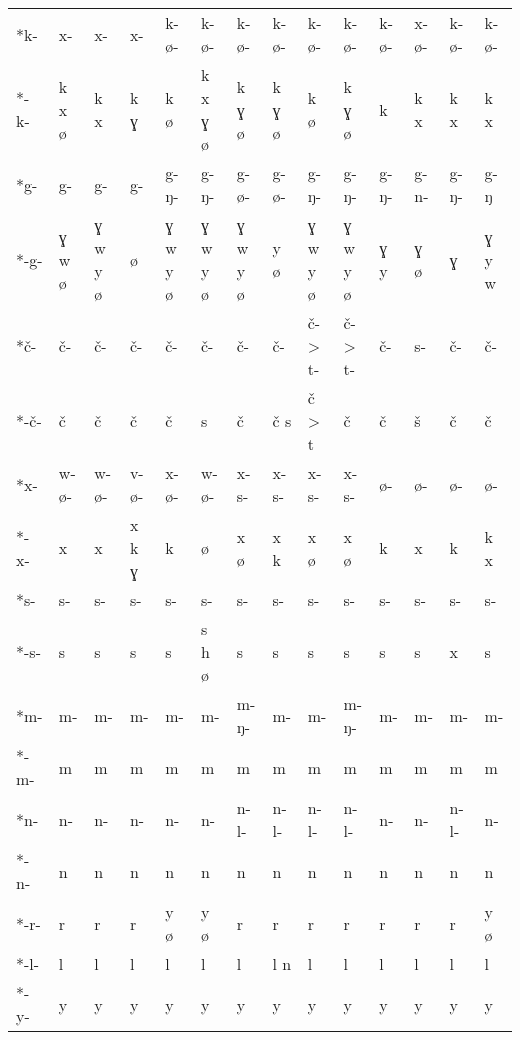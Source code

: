 \documentclass[output=paper,colorlinks,citecolor=brown]{langscibook}
\begin{document}
\begin{paperappendix}
\begin{longtable}{l  p{0.45cm}  p{0.45cm}  p{0.45cm}  p{0.45cm}  p{0.45cm}  p{0.45cm}  p{0.45cm}  p{0.45cm}  p{0.45cm}  p{0.45cm}  p{0.45cm}  p{0.45cm}  p{0.55cm}}
\tablevspace
*k-     &	x-  &	x-  &	x-  &	k- ø-   &	k- ø-   &	k- ø-   &	k- ø-   &	k- ø-   &	k- ø-   &	k- ø-   &	x- ø-   &	k- ø-   &	k- ø-\\
\tablevspace
*-k-    &	k x ø   &	k x &	k ɣ &	k ø &	k x ɣ ø &	k ɣ ø   &	k ɣ ø   &	k ø &	 k ɣ ø  &	k   &	k x &	k x &	k x\\
\tablevspace
*g-     &	g-  &	g-  &	g-  &	g- ŋ-   &	g- ŋ-   &	g- ø-   &	g- ø-   &	g- ŋ-   &	g- ŋ-   &	g- ŋ-   &	g- n-   &	g- ŋ-   &	g- ŋ\\
\tablevspace
*-g-    &	ɣ w ø   &	ɣ w y ø &	ø   &	ɣ w y ø &	ɣ w y ø &	ɣ w y ø &	y ø &	ɣ w y ø   &	ɣ w y ø &	ɣ y	&    ɣ ø    &   ɣ	&   ɣ y w\\
\tablevspace
*č-     &	č-  &	č-  &	č-  &	č-  &	č-  &	č-  &	č-  &	č- > t- &	č- > t- &	č-  &	s-  &	č-  &	č-\\
\tablevspace
*-č-    &	č   &	č   &	č   &	č   &	s   &	č   &	č s &	č > t   &	č   &	č   &	š   &	č   &	č\\
\tablevspace
*x-     &	w- ø-   &	w- ø-   &	v- ø-   &	x- ø-   &	w- ø-   &	x- s-   &	x- s-   &	x- s-   &	x- s-   &	ø-  &	ø-  &	ø-  &	ø-\\
\tablevspace
*-x-    &	x   &	x   &	x k ɣ   &	k   &	ø   &	x ø &	x k &	x ø &	x ø &	k   &	x   &	k   &	k x\\
\tablevspace
*s-     &	s-  &	s-  &	s-  &	s-  &	s-  &	s-  &	s-  &	s-  &	s-  &	s-  &	s-  &	s-  &	s-\\
\tablevspace
*-s-    &	s   &	s   &	s   &	s   &	s h ø   &	s   &	s   &	s   &	s   &	s   &	s   &	x   &	s\\
\tablevspace
*m-     &	m-  &	m-  &	m-  &	m-  &	m-  &	m- ŋ-   &	m-  &	m-  &	m- ŋ-   &	m-  &	m-  &	m-  &	m-\\
\tablevspace
*-m-    &	m   &	m   &	m   &	m   &	m   &	m   &	m   &	m   &	m   &	m   &	m   &	m   &	m\\
\tablevspace
*n-     &	n-  &	n-  &	n-  &	n-  &	n-  &	n- l-   &	n- l-   &	n- l-   &	n- l-   &	n-  &	n-  &	n- l-    &	n-\\
\tablevspace
*-n-    &	n   &	n   &	n   &	n   &	n   &	n   &	n   &	n   &	n   &	n   &	n   &	n   &	n\\
\tablevspace
*-r-    &	r   &	r   &	r   &	y ø &	y ø &	r   &	r   &	r   &	r   &	r   &	r   &	r   &	y ø\\
\tablevspace
*-l-    &	l   &	l   &	l   &	l   &	l   &	l   &	l n &	l   &	l   &	l   &	l   &	l   &	l\\
\tablevspace
*-y-    &	y   &	y   &	y   &	y   &	y   &	y   &	y   &	y   &	y   &	y   &	y   &	y   &	y\\
\end{longtable}\egroup
{}


\end{paperappendix}
\end{document}

